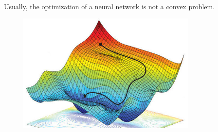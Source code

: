 Usually, the optimization of a neural network is not a convex problem.

\begin{figure}[htbp]
\centering
\includegraphics[width=0.8\textwidth]{images/nnopt}
\end{figure}
